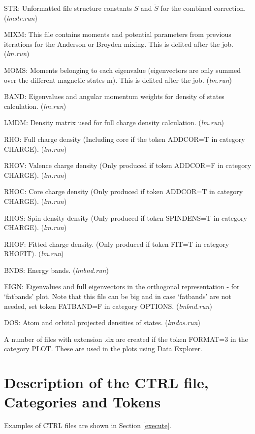 \documentclass[aps,twocolumn,a4]{revtex4}
\begin{document}
STR: Unformatted file structure constants $S$ and $\dot S$ for the
combined correction. ({\em lmstr.run})

MIXM:
This file contains moments and potential parameters from previous
iterations for the Anderson or Broyden mixing.  This is delited
after the job. ({\em lm.run})

MOMS: Moments belonging to each eigenvalue (eigenvectors are only
summed over the different magnetic states m). This is delited after
the job. ({\em lm.run})

BAND: Eigenvalues and angular momentum weights for density of states
calculation.  ({\em lm.run})

LMDM: Density matrix used for full charge density calculation.
({\em lm.run})

RHO: Full charge density (Including core if the token ADDCOR=T in
category CHARGE). ({\em lm.run})

RHOV: Valence charge density (Only produced if token ADDCOR=F in
category CHARGE). ({\em lm.run})

RHOC: Core charge density (Only produced if token ADDCOR=T in
category CHARGE). ({\em lm.run})

RHOS: Spin density density (Only produced if token SPINDENS=T in
category CHARGE). ({\em lm.run})

RHOF: Fitted charge density. (Only produced if token FIT=T in category
RHOFIT). ({\em lm.run})

BNDS: Energy bands. ({\em lmbnd.run})

EIGN: Eigenvalues and full eigenvectors in the orthogonal representation
- for `fatbands' plot.  Note that this file can be big and in case
`fatbands'
are not needed, set token FATBAND=F in category OPTIONS.
({\em lmbnd.run})

DOS: Atom and orbital projected densities of states.  ({\em lmdos.run})

A number of files with extension .dx are created if the token FORMAT=3
in the category PLOT. These are used in the plots using Data Explorer.

%
\section{Description of the CTRL file, Categories and Tokens}
\label{categ}

Examples of CTRL files are shown in Section \ref{execute}.
\end{document}
